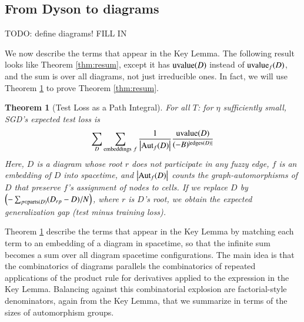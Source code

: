 \documentclass[final,12pt]{colt2021} %
\newtheorem{thm}{Theorem}
\newcommand{\wrap}[1]{\left(#1\right)}
\newcommand{\wabs}[1]{\left|#1\right|}
\newcommand{\Aut}{\text{\textnormal{Aut}}}
\newcommand{\uvalue}{\text{\textnormal{uvalue}}}
\newcommand{\edges}{\text{\textnormal{edges}}}
\newcommand{\parts}{\text{\textnormal{parts}}}
\begin{document}
    \subsection{From Dyson to diagrams}                             \label{appendix:toward-diagrams}

        {\color{red} TODO: define diagrams! FILL IN }

        We now describe the terms that appear in the Key Lemma.  The following
        result looks like Theorem \ref{thm:resum}, except it has $\uvalue(D)$
        instead of $\uvalue_f(D)$, and the sum is over all diagrams, not just
        irreducible ones.  In fact, we will use Theorem \ref{thm:pathint} to
        prove Theorem \ref{thm:resum}.

        \begin{thm}[Test Loss as a Path Integral] \label{thm:pathint}
            For all $T$: for $\eta$ sufficiently small, SGD's expected test
            loss is
            \begin{equation*}\label{eq:sgdcoef}
                \sum_{D}
                    \sum_{\text{embeddings}~f}
                    \frac{1}{\wabs{\Aut_f(D)}}
                \frac{\uvalue(D)}{(-B)^{|\edges(D)|}}
            \end{equation*}
            Here, $D$ is a diagram whose root $r$ does not participate in
            any fuzzy edge, $f$ is an embedding of $D$ into spacetime, and
            $\wabs{\Aut_f(D)}$ counts the graph-automorphisms of $D$ that
            preserve $f$'s assignment of nodes to cells.
            If we replace $D$ by 
            $
                \wrap{-\sum_{p \in \parts(D)} (D_{rp} - D)/N}
            $, where $r$ is $D$'s root,
            we obtain the expected generalization gap (test minus training loss).
        \end{thm}

        Theorem \ref{thm:pathint} describe the terms that appear in the Key
        Lemma by matching each term to an embedding of a diagram in spacetime,
        so that the infinite sum becomes a sum over all diagram spacetime
        configurations.  The main idea is that the combinatorics of diagrams
        parallels the combinatorics of repeated applications of the product
        rule for derivatives applied to the expression in the Key Lemma.
        Balancing against this combinatorial explosion are factorial-style
        denominators, again from the Key Lemma, that we summarize in terms of
        the sizes of automorphism groups.
\end{document}
